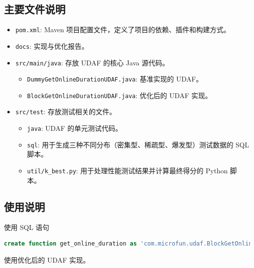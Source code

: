 \documentclass[UTF8]{ctexart}
\begin{document}
\subsection{主要文件说明}
\begin{itemize}
    \item \texttt{pom.xml}: Maven 项目配置文件，定义了项目的依赖、插件和构建方式。
    \item \texttt{docs}: 实现与优化报告。
    \item \texttt{src/main/java}: 存放 UDAF 的核心 Java 源代码。
    \begin{itemize}
        \item \texttt{DummyGetOnlineDurationUDAF.java}: 基准实现的 UDAF。
        \item \texttt{BlockGetOnlineDurationUDAF.java}: 优化后的 UDAF 实现。
    \end{itemize}
    \item \texttt{src/test}: 存放测试相关的文件。
    \begin{itemize}
        \item \texttt{java}: UDAF 的单元测试代码。
        \item \texttt{sql}: 用于生成三种不同分布（密集型、稀疏型、爆发型）测试数据的 SQL 脚本。
        \item \texttt{util/k\_best.py}: 用于处理性能测试结果并计算最终得分的 Python 脚本。
    \end{itemize}
\end{itemize}

\subsection{使用说明}

使用 SQL 语句
\begin{lstlisting}[language=SQL]
create function get_online_duration as 'com.microfun.udaf.BlockGetOnlineDurationUDAF';
\end{lstlisting}
使用优化后的 UDAF 实现。
\end{document}
